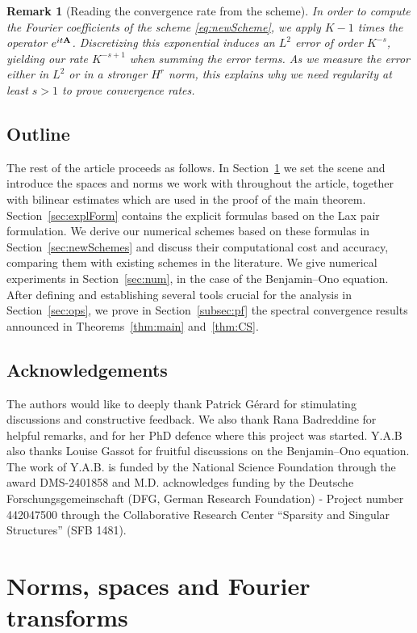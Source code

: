 \documentclass [11pt] {article}
\newtheorem{rem}[thm]{Remark}
\begin{document}
\begin{rem}[Reading the convergence rate from the scheme]\label{rem:read-rates}
In order to compute the Fourier coefficients of the scheme \eqref{eq:newScheme}, we apply $K-1$ times the operator $e^{it{\bf A}}$. Discretizing this exponential induces an $L^2$ error of order $K^{-s}$, yielding our rate $K^{-s+1}$ when summing the error terms.
As we measure the error either in $L^2$ or in a stronger $H^r$ norm, this explains why we need regularity at least $s>1$ to prove convergence rates.
\end{rem}

\subsection{Outline} The rest of the article proceeds as follows. In Section~\ref{sec:norms} we set the scene and introduce the spaces and norms we work with throughout the article, together with bilinear estimates which are used in the proof of the main theorem. Section~\ref{sec:explForm} contains the explicit formulas based on the Lax pair formulation. We derive our numerical schemes based on these formulas in Section~\ref{sec:newSchemes} and discuss their computational cost and accuracy, comparing them with existing schemes in the literature.  We give numerical experiments in Section~\ref{sec:num}, in the case of the Benjamin–Ono equation. After defining and establishing several tools crucial for the analysis in Section~\ref{sec:ops}, we prove in Section~\ref{subsec:pf} the spectral convergence results announced in Theorems~\ref{thm:main} and~\ref{thm:CS}.


\subsection*{Acknowledgements}
The authors would like to deeply thank Patrick Gérard for stimulating discussions and constructive feedback. We also thank Rana Badreddine for helpful remarks, and for her PhD defence where this project was started. Y.A.B also thanks Louise Gassot for fruitful discussions on the Benjamin–Ono equation.
The work of Y.A.B. is funded by the National Science Foundation through the award DMS-2401858 and M.D. acknowledges funding by the Deutsche Forschungsgemeinschaft (DFG, German Research Foundation) - Project number 442047500 through
the Collaborative Research Center “Sparsity and Singular Structures” (SFB 1481).

\section{Norms, spaces and Fourier transforms}\label{sec:norms}
\end{document}
